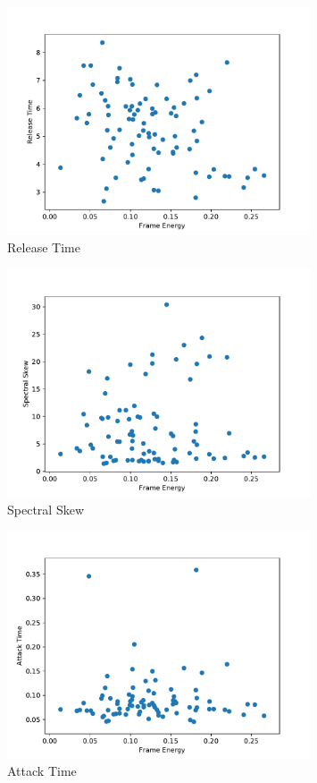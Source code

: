 \begin{figure}[H]
    \center
    \includegraphics[width = 0.8\textwidth]{Figures/rel.pdf}
    \caption{Release Time}
    \label{fig:im}
\end{figure}

\begin{figure}[H]
    \center
    \includegraphics[width = 0.8\textwidth]{Figures/specSkew.pdf}
    \caption{Spectral Skew}
    \label{fig:im}
\end{figure}

\begin{figure}[H]
    \center
    \includegraphics[width = 0.8\textwidth]{Figures/att.pdf}
    \caption{Attack Time}
    \label{fig:im}
\end{figure}